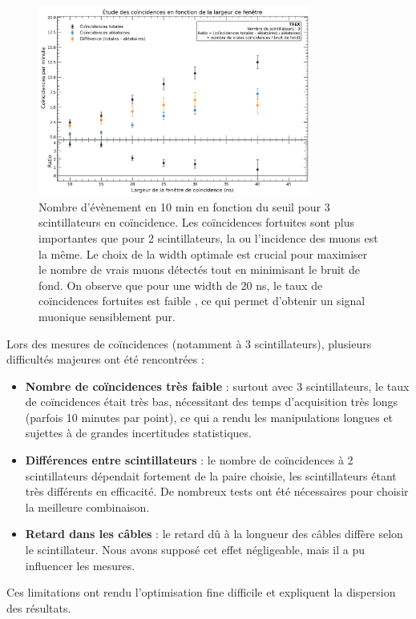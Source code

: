 \documentclass[a4paper,12pt,twoside]{article}
\begin{document}
\begin{figure}[!h]
    \centering
    \includegraphics[width=0.8\textwidth]{Images/Coincidences_3_Scintillateurs.png}
    \caption[Nombre d’évènement en 4min en fonction du seuil]{Nombre d’évènement en 10 min en fonction du seuil pour 3 scintillateurs en coïncidence.
    Les coïncidences fortuites sont plus importantes que pour 2 scintillateurs, la ou l'incidence des muons est la même. Le choix de la width optimale est crucial pour maximiser le nombre de vrais muons détectés tout en minimisant le bruit de fond. On observe que pour une width de 20 ns, le taux de coïncidences fortuites est  faible , ce qui permet d’obtenir un signal muonique sensiblement pur.}
    \label{fig:coincidences_3_scintillateurs}
  \end{figure}


\begin{center}
\begin{tcolorbox}[colback=red!5!white, colframe=red!80!black, title=Problèmes rencontrés lors des mesures de coïncidences]
Lors des mesures de coïncidences (notamment à 3 scintillateurs), plusieurs difficultés majeures ont été rencontrées :
\begin{itemize}
    \item \textbf{Nombre de coïncidences très faible} : surtout avec 3 scintillateurs, le taux de coïncidences était très bas, nécessitant des temps d'acquisition très longs (parfois 10 minutes par point), ce qui a rendu les manipulations longues et sujettes à de grandes incertitudes statistiques.
    \item \textbf{Différences entre scintillateurs} : le nombre de coïncidences à 2 scintillateurs dépendait fortement de la paire choisie, les scintillateurs étant très différents en efficacité. De nombreux tests ont été nécessaires pour choisir la meilleure combinaison.
    \item \textbf{Retard dans les câbles} : le retard dû à la longueur des câbles diffère selon le scintillateur. Nous avons supposé cet effet négligeable, mais il a pu influencer les mesures.
\end{itemize}
Ces limitations ont rendu l’optimisation fine difficile et expliquent la dispersion des résultats.
\end{tcolorbox}
\end{center}
\end{document}
